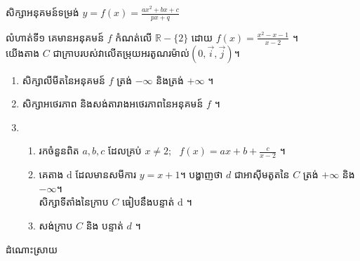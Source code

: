 \documentclass[expologarit]{subfiles}
\begin{document}
\begin{center}
\color{violet} \kml សិក្សាអនុគមន៍ទម្រង់ $y=f(x)=\frac{ax^2+bx+c}{px+q}$
\end{center}
{\color{violet}\kml លំហាត់ទី១} គេមានអនុគមន៍ $f$ កំណត់លើ $\mathbb{R}-\{2\}$ ដោយ $f(x)=\frac{x^2-x-1}{x-2}$ ។\\ យើងតាង $C$ ជាក្រាបរបស់វាលើតម្រុយអរតូណរម៉ាល់$\left(0,\overrightarrow{i},\overrightarrow{j}\right)$។
\begin{enumerate}[1]
\item សិក្សាលីមីតនៃអនុគមន៍ $f$ ត្រង់ $-\infty$ និងត្រង់ $+\infty$ ។
\item សិក្សាអថេរភាព និងសង់តារាងអថេរភាពនៃអនុគមន៍ $f$ ។
\item \begin{enumerate}[a]
\item រកចំនួនពិត $a,b,c$ ដែលគ្រប់ $x\neq 2;\ \ \ f(x)=ax+b+\frac{c}{x-2}$ ។
\item គេតាង $\mathrm{d}$ ដែលមានសមីការ $y=x+1$។ បង្ហាញថា $d$ ជាអាស៊ីមតូតនៃ $C$ ត្រង់ $+\infty$ និង $-\infty$។ 
\\ សិក្សាទីតាំងនៃក្រាប $C$ ធៀបនឹងបន្ទាត់ $\mathrm{d}$ ។
\item សង់ក្រាប $C$ និង បន្ទាត់ $d$ ។
\end{enumerate}
\end{enumerate}
\begin{center}
\color{violet}\kml ដំណោះស្រាយ
\end{center}
\end{document}
